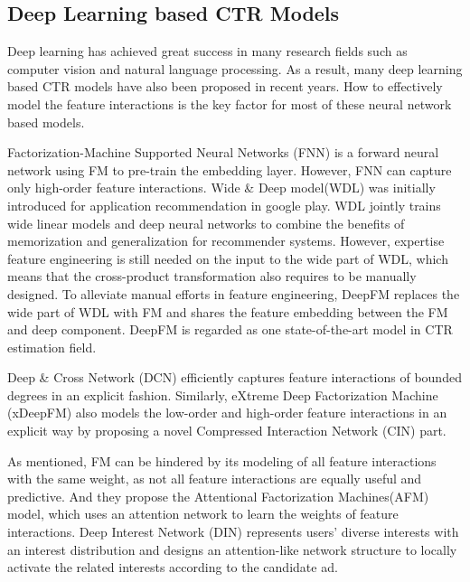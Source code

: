 \documentclass[sigconf]{acmart}
\begin{document}
\subsection{Deep Learning based CTR Models}
Deep learning has achieved great success in many research fields
such as computer vision\cite{krizhevsky2012imagenet, he2016deep} and natural language processing\cite{mikolov2010recurrent, cho2014learning}. As a result, many deep learning based CTR models have also been proposed in recent years\cite{zhang2016deep,cheng2016wide,xiao2017attentional,guo2017deepfm,lian2018xdeepfm,wang2017deep,zhou2018deep,He2017NFM}. How to
effectively model the feature interactions is the key factor for most of
these neural network based models.

Factorization-Machine Supported Neural Networks (FNN)\cite{zhang2016deep} is a
forward neural network using FM to pre-train the embedding layer.
However, FNN can capture only high-order feature interactions. Wide \&
Deep model(WDL)\cite{cheng2016wide} was initially introduced for application
recommendation in google play. WDL jointly trains wide linear models and
deep neural networks to combine the benefits of memorization and
generalization for recommender systems. However, expertise feature
engineering is still needed on the input to the wide part of WDL, which
means that the cross-product transformation also requires to be manually
designed. To alleviate manual efforts in feature engineering,
DeepFM\cite{guo2017deepfm} replaces the wide part of WDL with FM and shares the
feature embedding between the FM and deep component. DeepFM is regarded
as one state-of-the-art model in CTR estimation field.

Deep \& Cross Network (DCN)\cite{wang2017deep} efficiently captures feature
interactions of bounded degrees in an explicit fashion. Similarly,
eXtreme Deep Factorization Machine (xDeepFM)\cite{lian2018xdeepfm} also models the
low-order and high-order feature interactions in an explicit way by
proposing a novel Compressed Interaction Network (CIN) part.

As \cite{xiao2017attentional} mentioned, FM can be hindered by its modeling of all feature
interactions with the same weight, as not all feature interactions are
equally useful and predictive. And they propose the Attentional
Factorization Machines(AFM)\cite{xiao2017attentional} model, which uses an attention
network to learn the weights of feature interactions. Deep Interest
Network (DIN)\cite{zhou2018deep} represents users' diverse interests with an
interest distribution and designs an attention-like network structure to
locally activate the related interests according to the candidate ad.
\end{document}
